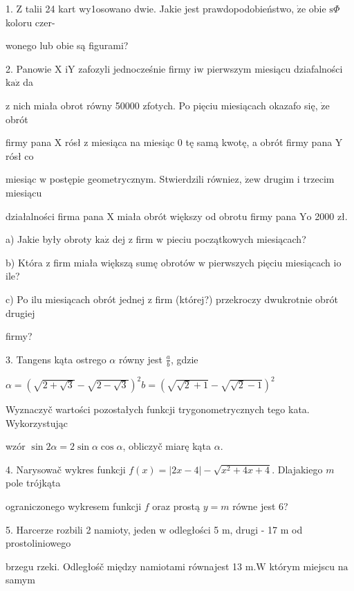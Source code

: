 \documentclass[a4paper,12pt]{article}
\begin{document}
1. $\mathrm{Z}$ talii 24 kart wy1osowano dwie. Jakie jest prawdopodobieństwo, $\dot{\mathrm{z}}\mathrm{e}$ obie $\mathrm{s}\Phi$ koloru czer-

wonego lub obie są figurami?

2. Panowie X $\mathrm{i}\mathrm{Y}$ zafozyli jednocześnie firmy $\mathrm{i}\mathrm{w}$ pierwszym miesiącu dziafalności $\mathrm{k}\mathrm{a}\dot{\mathrm{z}}$ da

$\mathrm{z}$ nich miała obrot równy 50000 zfotych. Po pięciu miesiącach okazafo się, $\dot{\mathrm{z}}\mathrm{e}$ obrót

firmy pana X rósł $\mathrm{z}$ miesiąca na miesiąc $0$ tę samą kwotę, a obrót firmy pana $\mathrm{Y}$ rósł co

miesiąc $\mathrm{w}$ postępie geometrycznym. Stwierdzili równiez, $\dot{\mathrm{z}}\mathrm{e}\mathrm{w}$ drugim $\mathrm{i}$ trzecim miesiącu

działalności firma pana X miała obrót większy od obrotu firmy pana $\mathrm{Y}\mathrm{o}$ 2000 zł.

a) Jakie były obroty $\mathrm{k}\mathrm{a}\dot{\mathrm{z}}$ dej $\mathrm{z}$ firm $\mathrm{w}$ pieciu początkowych miesiącach?

b) Która $\mathrm{z}$ firm miała większą sumę obrotów $\mathrm{w}$ pierwszych pięciu miesiącach $\mathrm{i}\mathrm{o}$ ile?

c) Po ilu miesiącach obrót jednej $\mathrm{z}$ firm (której?) przekroczy dwukrotnie obrót drugiej

firmy?

3. Tangens kąta ostrego $\alpha$ równy jest $\displaystyle \frac{a}{b}$, gdzie

$\alpha=(\sqrt{2+\sqrt{3}}-\sqrt{2-\sqrt{3}})^{2}b=(\sqrt{\sqrt{2}+1}-\sqrt{\sqrt{2}-1})^{2}$

Wyznaczyč wartości pozostałych funkcji trygonometrycznych tego kata. Wykorzystując

wzór $\sin 2\alpha=2\sin\alpha\cos\alpha$, obliczyč miarę kąta $\alpha.$

4. Narysowač wykres funkcji $f(x)=|2x-4|-\sqrt{x^{2}+4x+4}$. Dlajakiego $m$ pole trójkąta

ograniczonego wykresem funkcji $f$ oraz prostą $y=m$ równe jest 6?

5. Harcerze rozbili 2 namioty, jeden $\mathrm{w}$ odległości 5 $\mathrm{m}$, drugi - 17 $\mathrm{m}$ od prostoliniowego

brzegu rzeki. Odległośč między namiotami równajest 13 $\mathrm{m}. \mathrm{W}$ którym miejscu $\mathrm{n}\mathrm{a}$ samym
\end{document}
